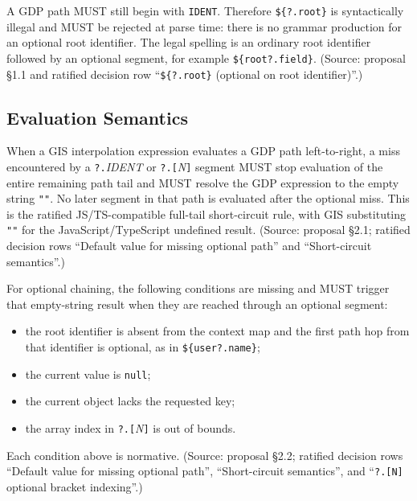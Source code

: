 A GDP path MUST still begin with \texttt{IDENT}.  Therefore
\texttt{\$\{?.root\}} is syntactically illegal and MUST be rejected at parse
time: there is no grammar production for an optional root identifier.  The
legal spelling is an ordinary root identifier followed by an optional segment,
for example \texttt{\$\{root?.field\}}.  (Source: proposal \S1.1 and ratified
decision row ``\texttt{\$\{?.root\}} (optional on root identifier)''.)

\subsection{Evaluation Semantics}
\label{subsec:gis:optional-chaining:semantics}

When a GIS interpolation expression evaluates a GDP path left-to-right, a miss
encountered by a \texttt{?.}\textit{IDENT} or \texttt{?.[}\textit{N}\texttt{]}
segment MUST stop evaluation of the entire remaining path tail and MUST resolve
the GDP expression to the empty string \texttt{""}.  No later segment in that
path is evaluated after the optional miss.  This is the ratified
JS/TS-compatible full-tail short-circuit rule, with GIS substituting
\texttt{""} for the JavaScript/TypeScript undefined result.  (Source: proposal
\S2.1; ratified decision rows ``Default value for missing optional path'' and
``Short-circuit semantics''.)

For optional chaining, the following conditions are missing and MUST trigger
that empty-string result when they are reached through an optional segment:

\begin{itemize}
  \item the root identifier is absent from the context map and the first path
    hop from that identifier is optional, as in \texttt{\$\{user?.name\}};
  \item the current value is \texttt{null};
  \item the current object lacks the requested key;
  \item the array index in \texttt{?.[}\textit{N}\texttt{]} is out of bounds.
\end{itemize}

\noindent Each condition above is normative.  (Source: proposal \S2.2;
ratified decision rows ``Default value for missing optional path'',
``Short-circuit semantics'', and ``\texttt{?.[N]} optional bracket indexing''.)

